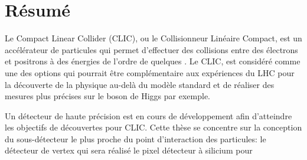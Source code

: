 \chapter*{Résumé}

Le Compact Linear Collider (CLIC), ou le Collisionneur Linéaire
Compact, est un accélérateur de particules qui permet d'effectuer des
collisions entre des électrons et positrons à des énergies de l'ordre
de quelques \tev. Le CLIC, est considéré comme une des options qui
pourrait être complémentaire aux expériences du LHC pour la découverte
de la physique au-delà du modèle standard et de réaliser des mesures
plus précises sur le boson de Higgs par exemple.

Un détecteur de haute précision est en cours de développement afin
d'atteindre les objectifs de découvertes pour CLIC. Cette thèse se
concentre sur la conception du sous-détecteur le plus proche du point
d'interaction des particules: le détecteur de vertex qui sera réalisé le pixel
détecteur à silicium pour
